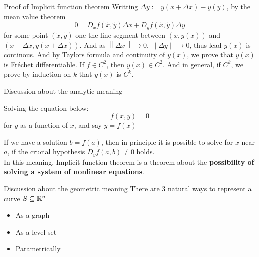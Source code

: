 \begin{frame}{Proof of Implicit function theorem}
    Writting $\Delta y := y(x+\Delta x) - y(y)$, by the mean value theorem
    \begin{equation}
        0 = D_xf(\widetilde{x}, \widetilde{y})\Delta x + D_yf(\widetilde{x}, \widetilde{y})\Delta y
    \end{equation}
    for some point $(\widetilde{x}, \widetilde{y})$ one the line segment between $(x, y(x))$ and $(x + \Delta x, y(x + \Delta x))$. And as $\left \| \Delta x \right \| \rightarrow 0$,  $\left \| \Delta y \right \| \rightarrow 0$, thus lead $y(x)$ is continous.
    \vspace{1cm}
    And by Taylors formula and continuity of $y(x)$, we prove that $y(x)$ is Fréchet differentiable.
    \vspace{1cm}
    If $f \in C^2$, then $y(x) \in C^2$. And in general, if $C^k$, we prove by induction on $k$ that $y(x)$ is $C^k$.
\end{frame}

\begin{frame}{Discussion about the analytic meaning}
    \begin{parchment}[Problem]
        Solving the equation below:
        \begin{equation}
            f(x, y) = 0
        \end{equation}
        for $y$ as a function of $x$, and say $y = f(x)$
    \end{parchment}
    If we have a solution $b = f(a)$, then in principle it is possible to solve for $x$ near $a$, if the crucial hypothesis $D_yf(a, b) \ne 0$ holds.\\
    In this meaning, Implicit function theorem is a theorem about the \textbf{possibility of solving a system of nonlinear equations}.
\end{frame}

\begin{frame}{Discussion about the geometric meaning}
    There are 3 natural ways to represent a curve $S \subseteq \mathbb{R}^n$
    \begin{itemize}
        \item As a graph
        \item As a level set
        \item Parametrically
    \end{itemize}
\end{frame}

